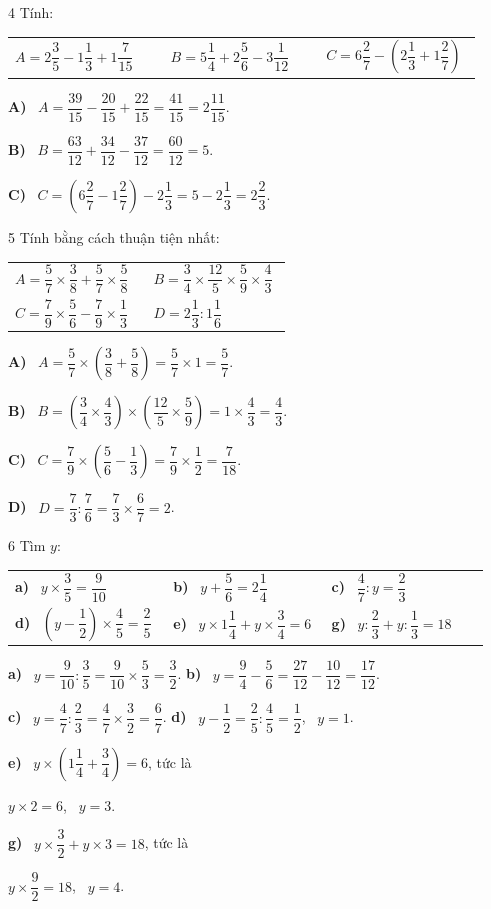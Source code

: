 \documentclass[11pt]{article}
\makeatletter
\newif\ifsol \solfalse
\renewcommand{\arraystretch}{1.35}
\newcommand{\probsol}[1]{%
  \begin{lrbox}{\solmeasure}\begin{minipage}{\dimexpr\linewidth-24pt\relax}#1\end{minipage}\end{lrbox}%
  \ifsol
    \begin{solbox}#1\end{solbox}%
  \else
    \setlength{\solht}{\dimexpr\ht\solmeasure+\dp\solmeasure+0.85cm\relax}%
    \ifdim\solht<1.35cm\setlength{\solht}{1.35cm}\fi
    \begin{tcolorbox}[colback=white,colframe=Line,boxrule=0.8pt,arc=5pt,
      left=8pt,right=8pt,top=4pt,bottom=4pt,height=\solht]{\footnotesize\color{Slate}\itshape\WorkWord}\end{tcolorbox}%
  \fi}
\newcommand{\pa}[1]{\textbf{#1)}\ }
\newenvironment{cols2}{\par\vspace{3pt}\noindent\setlength{\tabcolsep}{0pt}\renewcommand{\arraystretch}{1.3}%
  \begin{tabular}{@{}>{\raggedright\arraybackslash\rule{0pt}{4.4ex}}p{0.48\linewidth}<{\rule[-2.3ex]{0pt}{0pt}}@{\hspace{0.03\linewidth}}>{\raggedright\arraybackslash\rule{0pt}{4.4ex}}p{0.48\linewidth}<{\rule[-2.3ex]{0pt}{0pt}}@{}}}%
  {\end{tabular}\par}
\newenvironment{cols3}{\par\vspace{3pt}\noindent\setlength{\tabcolsep}{0pt}\renewcommand{\arraystretch}{1.3}%
  \begin{tabular}{@{}>{\raggedright\arraybackslash\rule{0pt}{4.4ex}}p{0.32\linewidth}<{\rule[-2.3ex]{0pt}{0pt}}@{\hspace{0.015\linewidth}}>{\raggedright\arraybackslash\rule{0pt}{4.4ex}}p{0.32\linewidth}<{\rule[-2.3ex]{0pt}{0pt}}@{\hspace{0.015\linewidth}}>{\raggedright\arraybackslash\rule{0pt}{4.4ex}}p{0.32\linewidth}<{\rule[-2.3ex]{0pt}{0pt}}@{}}}%
  {\end{tabular}\par}
\newcommand{\gap}{\vspace{0.3cm}}
\def\WorkWord{Bài làm:}
\makeatother
\begin{document}
\gap
\begin{probbox}{4}{\relax}
Tính:
\begin{cols3}
$A=2\dfrac35-1\dfrac13+1\dfrac7{15}$ & $B=5\dfrac14+2\dfrac56-3\dfrac1{12}$ & $C=6\dfrac27-\left(2\dfrac13+1\dfrac27\right)$
\end{cols3}
\end{probbox}
\probsol{
\pa{A} $A=\dfrac{39}{15}-\dfrac{20}{15}+\dfrac{22}{15}=\dfrac{41}{15}=2\dfrac{11}{15}$.\par
\pa{B} $B=\dfrac{63}{12}+\dfrac{34}{12}-\dfrac{37}{12}=\dfrac{60}{12}=5$.\par
\pa{C} $C=\left(6\dfrac27-1\dfrac27\right)-2\dfrac13=5-2\dfrac13=2\dfrac23$.
}
\gap
\begin{probbox}{5}{\relax}
Tính bằng cách thuận tiện nhất:
\begin{cols2}
$A=\dfrac57\times\dfrac38+\dfrac57\times\dfrac58$ & $B=\dfrac34\times\dfrac{12}5\times\dfrac59\times\dfrac43$\\
$C=\dfrac79\times\dfrac56-\dfrac79\times\dfrac13$ & $D=2\dfrac13:1\dfrac16$
\end{cols2}
\end{probbox}
\probsol{
\pa{A} $A=\dfrac57\times\left(\dfrac38+\dfrac58\right)=\dfrac57\times1=\dfrac57$.\par
\pa{B} $B=\left(\dfrac34\times\dfrac43\right)\times\left(\dfrac{12}5\times\dfrac59\right)=1\times\dfrac43=\dfrac43$.\par
\pa{C} $C=\dfrac79\times\left(\dfrac56-\dfrac13\right)=\dfrac79\times\dfrac12=\dfrac7{18}$.\par
\pa{D} $D=\dfrac73:\dfrac76=\dfrac73\times\dfrac67=2$.
}
\gap
\begin{probbox}{6}{\relax}
Tìm $y$:
\begin{cols3}
\pa{a} $y\times\dfrac35=\dfrac9{10}$ & \pa{b} $y+\dfrac56=2\dfrac14$ & \pa{c} $\dfrac47:y=\dfrac23$\\
\pa{d} $\left(y-\dfrac12\right)\times\dfrac45=\dfrac25$ & \pa{e} $y\times1\dfrac14+y\times\dfrac34=6$ & \pa{g} $y:\dfrac23+y:\dfrac13=18$
\end{cols3}
\end{probbox}
\probsol{
\pa{a} $y=\dfrac9{10}:\dfrac35=\dfrac9{10}\times\dfrac53=\dfrac32$. \qquad \pa{b} $y=\dfrac94-\dfrac56=\dfrac{27}{12}-\dfrac{10}{12}=\dfrac{17}{12}$.\par
\pa{c} $y=\dfrac47:\dfrac23=\dfrac47\times\dfrac32=\dfrac67$. \qquad \pa{d} $y-\dfrac12=\dfrac25:\dfrac45=\dfrac12$, \ $y=1$.\par
\pa{e} $y\times\left(1\dfrac14+\dfrac34\right)=6$, tức là\par $y\times2=6$, \ $y=3$.\par
\pa{g} $y\times\dfrac32+y\times3=18$, tức là\par $y\times\dfrac92=18$, \ $y=4$.
}
\end{document}
